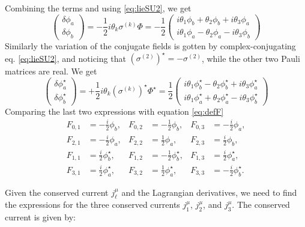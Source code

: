 Combining the terms and using \eqref{eq:lieSU2}, we get
\[
\begin{pmatrix}
    \delta \phi_a \\
    \delta \phi_b 
\end{pmatrix}
=
-\frac{1}{2}i \theta_k \sigma^{(k)} \Phi = -\frac{1}{2}\begin{pmatrix} i \theta_1 \phi_b + \theta_2 \phi_b + i \theta_3 \phi_a \\ i \theta_1 \phi_a - \theta_2 \phi_a - i \theta_3 \phi_b \end{pmatrix}
\]
Similarly the variation of the conjugate fields is gotten by complex-conjugating eq. \eqref{eq:lieSU2}, and noticing that  $(\sigma^{(2)})^\star=-\sigma^{(2)}$, while the other two Pauli matrices are real. We get
\begin{equation*}
    \begin{pmatrix}
    \delta \phi_a^\star \\
    \delta \phi_b ^\star
\end{pmatrix}
=
+\frac{1}{2}i \theta_k( \sigma^{(k)} )^\star \Phi^\star = \frac{1}{2}\begin{pmatrix} i \theta_1 \phi_b^\star - \theta_2 \phi_b^\star + i \theta_3 \phi_a^\star \\ i \theta_1 \phi_a^\star + \theta_2 \phi_a^\star - i \theta_3 \phi_b^\star \end{pmatrix}
\end{equation*}
Comparing the last two expressions with equation \eqref{eq:defF}
\begin{align}
F_{0,1} &= -\frac{i}{2} \phi_b, & F_{0,2} &= -\frac{1}{2} \phi_b, & F_{0,3} &= -\frac{i}{2} \phi_a, \\
F_{2,1} &= -\frac{i}{2} \phi_a, & F_{2,2} &= \frac{1}{2} \phi_a, & F_{2,3} &= \frac{i}{2} \phi_b, \\
F_{1,1} &= \frac{i}{2} \phi_b^\star, & F_{1,2} &= -\frac{1}{2} \phi_b^\star, & F_{1,3} &= \frac{i}{2} \phi_a^\star, \\
F_{3,1} &= \frac{i}{2} \phi_a^\star, & F_{3,2} &= \frac{1}{2} \phi_a^\star, & F_{3,3} &= -\frac{i}{2} \phi_b^\star.
\end{align}

   
Given the conserved current \( j^\mu_\ell \) and the Lagrangian derivatives, we need to find the expressions for the three conserved currents \( j^\mu_1 \), \( j^\mu_2 \), and \( j^\mu_3 \). The conserved current is given by:

